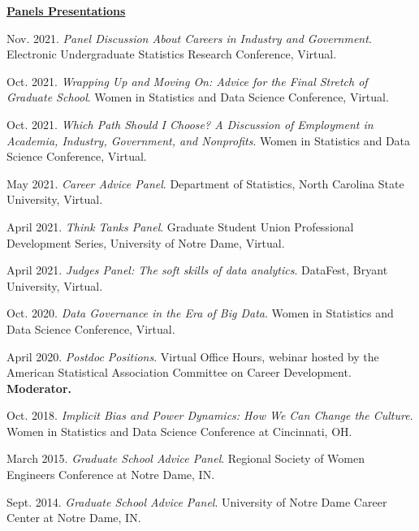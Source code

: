 \documentclass[11pt, letterpaper, roman]{moderncv} %
\begin{document}
\begin{etaremune}[topsep=0pt, itemsep=6pt, partopsep=0pt, parsep=0pt]
\vspace{6pt}
\hspace{-0.30in}\underline{\textbf{\large Panels Presentations}}\normalsize
    \item Nov. 2021. \textit{Panel Discussion About Careers in Industry and Government}. Electronic Undergraduate Statistics Research Conference, Virtual.

    \item Oct. 2021. \textit{Wrapping Up and Moving On: Advice for the Final Stretch of Graduate School}. Women in Statistics and Data Science Conference, Virtual.
    
    \item Oct. 2021. \textit{Which Path Should I Choose? A Discussion of Employment in Academia, Industry, Government, and Nonprofits}. Women in Statistics and Data Science Conference, Virtual.

    \item May 2021. \textit{Career Advice Panel}. Department of Statistics, North Carolina State University, Virtual.
    
    \item April 2021. \textit{Think Tanks Panel}. Graduate Student Union Professional Development Series, University of Notre Dame, Virtual.
    
    \item April 2021. \textit{Judges Panel: The soft skills of data analytics}. DataFest, Bryant University, Virtual.
    
    \item Oct. 2020. \textit{Data Governance in the Era of Big Data}. Women in Statistics and Data Science Conference, Virtual.
    
    \item April 2020. \textit{Postdoc Positions}. Virtual Office Hours, webinar hosted by the American Statistical Association Committee on Career Development. \textbf{Moderator.}
    
    \item Oct. 2018. \textit{Implicit Bias and Power Dynamics: How We Can Change the Culture}. Women in Statistics and Data Science Conference at Cincinnati, OH.
    
    \item March 2015. \textit{Graduate School Advice Panel}.  Regional Society of Women Engineers Conference at Notre Dame, IN.
    
    \item Sept. 2014. \textit{Graduate School Advice Panel}.  University of Notre Dame Career Center at Notre Dame, IN.
    

\end{etaremune}
\end{document}
